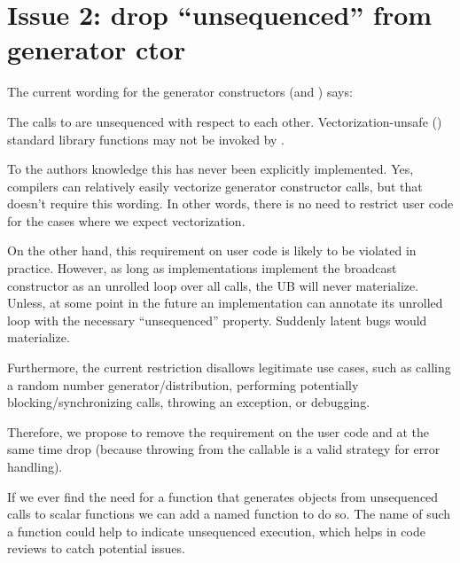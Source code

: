\section{Issue 2: drop “unsequenced” from generator ctor}\label{sec:generatorctor}

The current wording for the generator constructors (\simd and \mask) says:
\begin{wgText}
    The calls to  are unsequenced with respect to each other.
    Vectorization-unsafe () standard library
    functions may not be invoked by .
\end{wgText}

To the authors knowledge this has never been explicitly implemented.
Yes, compilers can relatively easily vectorize generator constructor calls, but that doesn't require
this wording.
In other words, there is no need to restrict user code for the cases where we expect vectorization.

On the other hand, this requirement on user code is likely to be violated in practice.
However, as long as implementations implement the broadcast constructor as an unrolled loop over all
calls, the UB will never materialize.
Unless, at some point in the future an implementation can annotate its unrolled loop with the
necessary “unsequenced” property.
Suddenly latent bugs would materialize.

Furthermore, the current restriction disallows legitimate use cases, such as calling a random number
generator/distribution, performing potentially blocking/synchronizing calls, throwing an exception,
or \std{} debugging.

Therefore, we propose to remove the requirement on the user code and at the same time drop
 (because throwing from the callable is a valid strategy for error handling).

If we ever find the need for a function that generates  objects from unsequenced calls to
scalar functions we can add a named function to do so.
The name of such a function could help to indicate unsequenced execution, which helps in code
reviews to catch potential issues.

